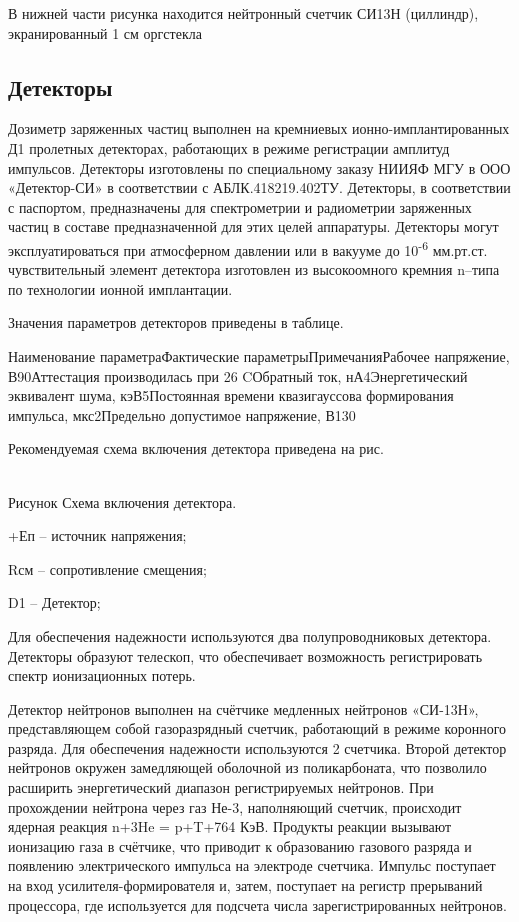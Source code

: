 \documentclass[a4paper,portrait,12pt]{article}
\begin{document}
{{{{В нижней части рисунка находится нейтронный счетчик СИ13Н (циллиндр), экранированный 1 см оргстекла





\subsection*{	\textbf{Детекторы}}

\hypertarget{_Toc309891358}{Дозиметр заряженных частиц выполнен на кремниевых ионно-имплантированных Д1 пролетных детекторах, работающих в режиме регистрации амплитуд импульсов. Детекторы изготовлены по специальному заказу НИИЯФ МГУ в ООО «Детектор-СИ» в соответствии с АБЛК.418219.402ТУ. Детекторы, в соответствии с паспортом, предназначены для спектрометрии и радиометрии заряженных частиц в составе предназначенной для этих целей аппаратуры. Детекторы могут эксплуатироваться при атмосферном давлении или в вакууме до 10\textsuperscript{-6} мм.рт.ст. чувствительный элемент детектора изготовлен из высокоомного кремния n--типа по технологии ионной имплантации.


Значения параметров детекторов приведены в таблице.


Наименование параметраФактические параметрыПримечанияРабочее напряжение, В90Аттестация производилась при 26 CОбратный ток, нА4Энергетический эквивалент шума, кэВ5Постоянная времени квазигауссова формирования импульса, мкс2Предельно допустимое напряжение, В130





Рекомендуемая схема включения детектора приведена на рис. 


\\Рисунок Схема включения детектора.


+Еп -- источник напряжения;


Rсм -- сопротивление смещения;


D1 -- Детектор;





Для обеспечения надежности используются два полупроводниковых детектора. Детекторы образуют телескоп, что обеспечивает возможность регистрировать спектр ионизационных потерь.}


Детектор нейтронов выполнен на счётчике медленных нейтронов «СИ-13Н», представляющем собой газоразрядный  счетчик, работающий в режиме коронного разряда. Для обеспечения надежности используются 2 счетчика. Второй детектор нейтронов окружен замедляющей оболочной из поликарбоната, что позволило расширить энергетический диапазон регистрируемых нейтронов. При прохождении нейтрона через газ Не-3, наполняющий счетчик, происходит ядерная реакция n+3He = p+T+764 КэВ. Продукты реакции вызывают ионизацию газа в счётчике, что приводит к образованию газового разряда и появлению электрического импульса на электроде счетчика. Импульс поступает на вход усилителя-формирователя и, затем, поступает на регистр прерываний процессора, где используется для подсчета числа зарегистрированных нейтронов.





}}}}
\end{document}

